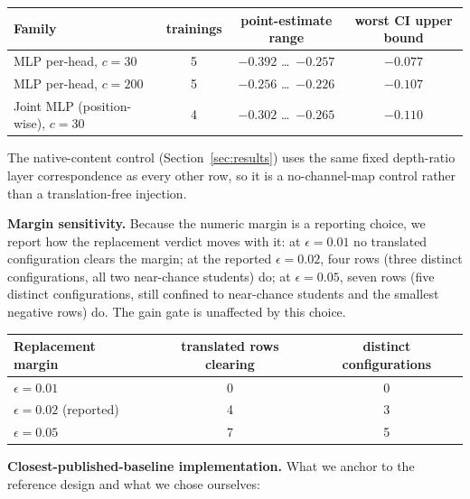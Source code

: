 \documentclass[10pt]{article}
\begin{document}
\begin{center}
\footnotesize
\begin{tabular}{lccc}
\toprule
Family & trainings & point-estimate range & worst CI upper bound \\
\midrule
MLP per-head, $c{=}30$ & 5 & $-0.392$ \dots\ $-0.257$ & $-0.077$ \\
MLP per-head, $c{=}200$ & 5 & $-0.256$ \dots\ $-0.226$ & $-0.107$ \\
Joint MLP (position-wise), $c{=}30$ & 4 & $-0.302$ \dots\ $-0.265$ & $-0.110$ \\
\bottomrule
\end{tabular}
\end{center}

The native-content control (Section~\ref{sec:results}) uses the same fixed
depth-ratio layer correspondence as every other row, so it is a
no-channel-map control rather than a translation-free injection.

\textbf{Margin sensitivity.} Because the numeric margin is a reporting choice, we report how the
replacement verdict moves with it: at $\epsilon{=}0.01$ no translated configuration clears the margin; at
the reported $\epsilon{=}0.02$, four rows (three distinct configurations, all two near-chance students) do;
at $\epsilon{=}0.05$, seven rows (five distinct configurations, still confined to near-chance students and the
smallest negative rows) do. The gain gate is unaffected by this choice.

\begin{center}\scriptsize
\begin{tabular}{lcc}
\toprule
Replacement margin & translated rows clearing & distinct configurations \\
\midrule
$\epsilon=0.01$ & 0 & 0 \\
$\epsilon=0.02$ (reported) & 4 & 3 \\
$\epsilon=0.05$ & 7 & 5 \\
\bottomrule
\end{tabular}\end{center}

\textbf{Closest-published-baseline implementation.} What we anchor to the reference design and what we chose
ourselves:
\end{document}
